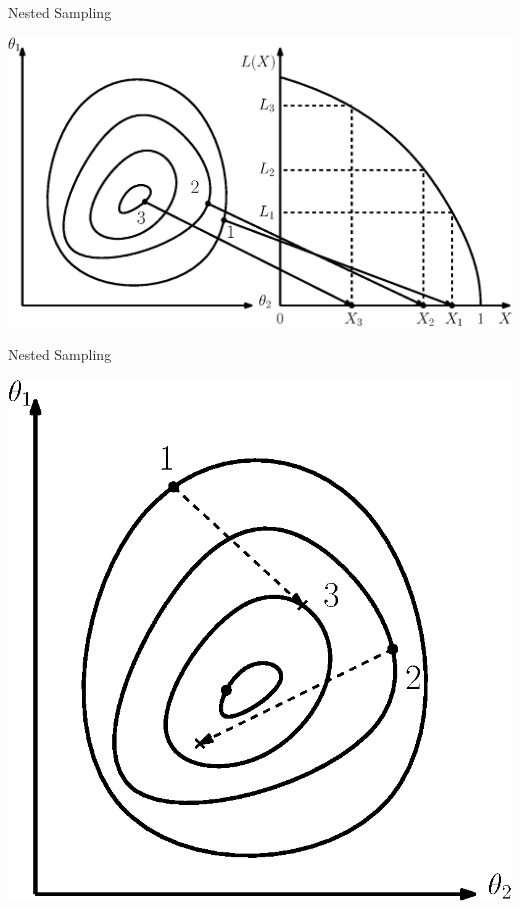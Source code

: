 \documentclass[xcolor=dvipsnames]{beamer}
\begin{document}
\begin{frame}[t]{Nested Sampling}
  \begin{center}
    \includegraphics[height=0.75\textheight]{./image/prior_mass.eps}
  \end{center}
\end{frame}

\begin{frame}[t]{Nested Sampling}
  \begin{center}
    \includegraphics[height=0.8\textheight]{./image/nested_sampling.eps}
  \end{center}
\end{frame}
\end{document}
